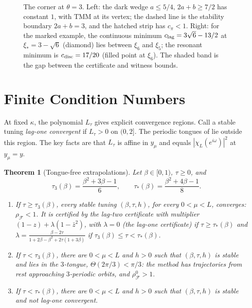 \documentclass[11pt]{article}
\newtheorem{theorem}{Theorem}[section]
\theoremstyle{definition}
\theoremstyle{remark}
\newcommand{\cF}{\mathcal F}
\newcommand{\rhoF}{\rho_{\cF}}
\newcommand{\rhoz}{\rho_{\cF}^{0}}
\newcommand{\clag}{c_{\rm lag}}\newcommand{\clayer}{c_{\rm layer}}\newcommand{\cdisc}{c_{\rm disc}}
\newcommand{\cpi}{c_{\pi}}
\begin{document}
\begin{figure}[t]
\caption{The corner at \(\theta=3\).
Left: the dark wedge \(a\le5/4\), \(2a+b\ge7/2\) has constant \(1\),
with TMM at its vertex; the dashed line is the stability boundary \(2a+b=3\),
and the hatched strip has \(\cpi<1\).
Right: for the marked example, the continuous minimum
\(\clag=3\sqrt6-13/2\) at \(\xi_*=3-\sqrt6\) (diamond) lies between \(\xi_6\) and \(\xi_5\);
the resonant minimum is \(\cdisc=17/20\) (filled point at \(\xi_6\)).
The shaded band is the gap between the certificate and witness bounds.}
\label{fig:corner}
\end{figure}

%
\section{Finite Condition Numbers}
\label{sec:finite}
%

At fixed \(\kappa\), the polynomial \(L_\tau\) gives explicit convergence regions.
Call a stable tuning \emph{lag-one convergent} if \(L_\tau>0\) on \((0,2]\).
The periodic tongues of  lie outside this region.
The key facts are that \(L_\tau\) is affine in \(y_\mu\) and equals
\(|\chi_L(e^{i\omega})|^2\) at \(y_\mu=y\).

\begin{samepage}
\begin{theorem}[Tongue-free extrapolations]\label{thm:tonguefree}
Let \(\beta\in[0,1)\), \(\tau\ge0\), and
\[
\tau_3(\beta)=\frac{\beta^2+3\beta-1}6,\qquad \tau_*(\beta)=\frac{\beta^2+4\beta-1}8 .
\]
\begin{enumerate}[label=\textup{(\alph*)}]
\item If \(\tau\ge\tau_3(\beta)\), every stable tuning \((\beta,\tau,h)\), for every
\(0<\mu<L\), converges: \(\rhoF<1\).  It is certified by the lag-two certificate with multiplier
\((1-z)+\lambda(1-\bar z^2)\), with \(\lambda=0\) (the lag-one certificate) if
\(\tau\ge\tau_*(\beta)\) and
\(\lambda=\frac{\beta-2\tau}{1+2\beta-\beta^2+2\tau(1+3\beta)}\) if
\(\tau_3(\beta)\le\tau<\tau_*(\beta)\).
\item If \(\tau<\tau_3(\beta)\), there are \(0<\mu<L\) and \(h>0\) such that
\((\beta,\tau,h)\) is stable and lies in the \(3\)-tongue, \(\Theta(2\pi/3)<\pi/3\):
the method has trajectories from rest approaching \(3\)-periodic orbits, and
\(\rhoz>1\).
\item If \(\tau<\tau_*(\beta)\), there are \(0<\mu<L\) and \(h>0\) such that
\((\beta,\tau,h)\) is stable and not lag-one convergent.
\end{enumerate}
\end{theorem}
\end{samepage}
\end{document}
